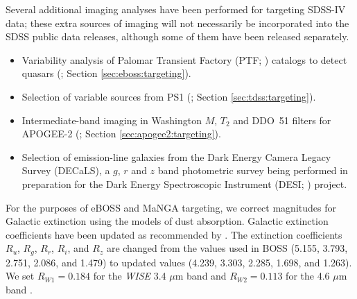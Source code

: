 Several additional imaging analyses have been performed for targeting
SDSS-IV data; these extra sources of imaging will not necessarily be
incorporated into the SDSS public data releases, although some of them
have been released separately. 
\begin{itemize}
\item Variability analysis of Palomar Transient Factory
(PTF; \citealt{law09a}) catalogs to detect quasars 
(\citealt{palanquedelabrouille16a};
Section \ref{sec:eboss:targeting}). 
\item Selection of variable sources from PS1 (\citealt{morganson15a};
Section \ref{sec:tdss:targeting}). 
\item Intermediate-band imaging in Washington $M$, $T_2$ and 
DDO~51 filters for APOGEE-2 (\citealt{majewski00a,zasowski13a};
Section \ref{sec:apogee2:targeting}).
\item Selection of emission-line galaxies from the Dark Energy Camera
Legacy Survey (DECaLS), a $g$, $r$ and $z$ band photometric survey
being performed in preparation for the Dark Energy Spectroscopic
Instrument (DESI; \citealt{levi13a}) project.
\end{itemize}

For the purposes of eBOSS and MaNGA targeting, we correct magnitudes
for Galactic extinction using the \citet{schlegel98a} models of dust
absorption.  Galactic extinction coefficients have been updated as
recommended by \citet{schlafly11a}.  The extinction coefficients
$R_u$, $R_g$, $R_r$, $R_i$, and $R_z$ are changed from the values used
in BOSS (5.155, 3.793, 2.751, 2.086, and 1.479) to updated values
(4.239, 3.303, 2.285, 1.698, and 1.263).  We set $R_{W1}=0.184$ for
the {\it WISE} 3.4 $\mu$m band and $R_{W2}=0.113$ for the 4.6 $\mu$m
band \citep{fitzpatrick99a}.
